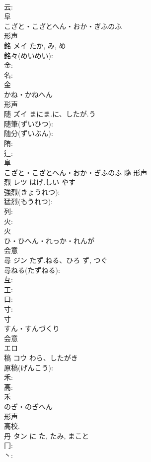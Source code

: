\documentclass[8pt]{extreport}
\begin{document}
\begin{CJK}{UTF8}{min}
\\	云: 
\\	阜	
\\	こざと・こざとへん・おか・ぎふのふ	
\\	形声 
\\	銘	メイ		たか, み, め	
\\	銘々(めいめい): 
\\	金: 
\\	名: 
\\	金	
\\	かね・かねへん	
\\	形声 
\\	随	ズイ	まにま.に、したが.う		
\\	随筆(ずいひつ): 
\\	随分(ずいぶん): 
\\	陏: 
\\	辶: 
\\	阜	
\\	こざと・こざとへん・おか・ぎふのふ	隨	形声 
\\	烈	レツ	はげ.しい	やす	
\\	強烈(きょうれつ): 
\\	猛烈(もうれつ): 
\\	列: 
\\	火: 
\\	火	
\\	ひ・ひへん・れっか・れんが	
\\	会意 
\\	尋	ジン	たず.ねる、ひろ	ず, つぐ	
\\	尋ねる(たずねる): 
\\	彑: 
\\	工: 
\\	口: 
\\	寸: 
\\	寸	
\\	すん・すんづくり	
\\	会意 
\\	エロ 
\\	稿	コウ	わら、したがき		
\\	原稿(げんこう): 
\\	禾: 
\\	高: 
\\	禾	
\\	のぎ・のぎへん	
\\	形声 
\\	高校.
\\	丹	タン	に	た, たみ, まこと	
\\	冂: 
\\	丶: 

\end{CJK}
\end{document}

